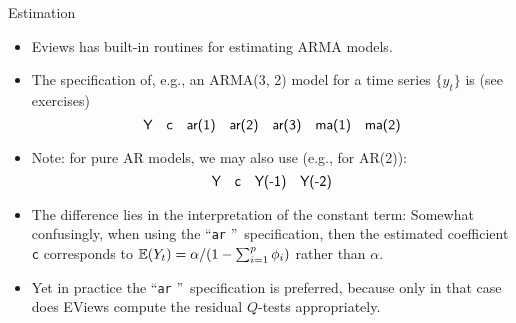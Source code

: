 \begin{frame}{Estimation}
\begin{itemize}
\item Eviews has built-in routines for estimating ARMA models.
\item The specification of, e.g.,
an ARMA(3, 2) model for a time series $\{y_t\}$ is (see exercises)
\begin{equation*}
\text{\textsf{Y\quad c\quad ar(1)\quad ar(2)\quad ar(3)\quad ma(1)\quad ma(2)%
}}
\end{equation*}%
\item Note: for pure AR models, we may also use (e.g., for AR(2)):%
\begin{equation*}
\text{\textsf{Y\quad c\quad Y(-1)\quad Y(-2)}}
\end{equation*}%
\item The difference lies in the interpretation
of the constant term: Somewhat confusingly, when using the \textquotedblleft \texttt{ar}%
\textquotedblright\ specification, then the estimated coefficient \texttt{c} corresponds to ${\mathbb E}(Y_t) = \alpha/(1-\sum_{i=1}^p \phi_i)$ rather than $\alpha$.
\item Yet in practice the \textquotedblleft \texttt{ar}%
\textquotedblright\ specification is preferred, because only in that case does
EViews compute the residual $Q$-tests appropriately.

\end{itemize}
\end{frame}


